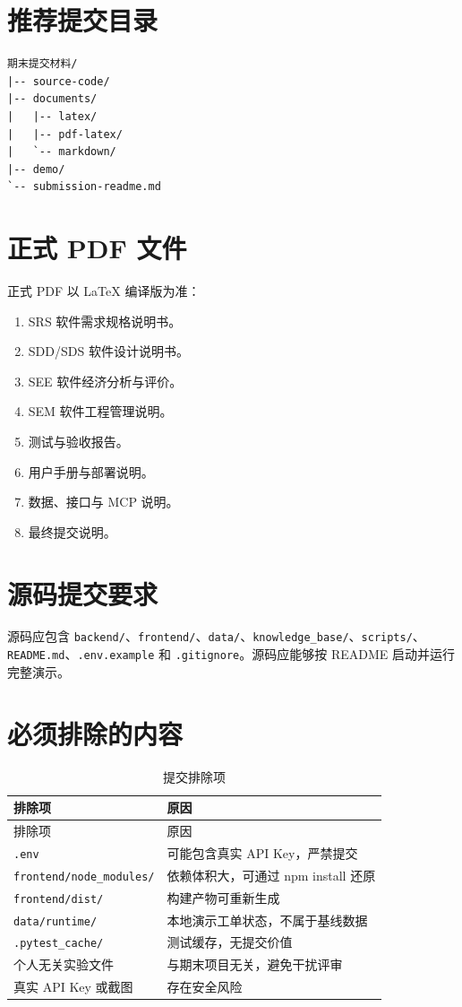 \documentclass[12pt,a4paper]{ctexart}
\newcommand{\code}[1]{{\footnotesize\nolinkurl{#1}}}
\begin{document}
\section{推荐提交目录}
\begin{verbatim}
期末提交材料/
|-- source-code/
|-- documents/
|   |-- latex/
|   |-- pdf-latex/
|   `-- markdown/
|-- demo/
`-- submission-readme.md
\end{verbatim}

\section{正式 PDF 文件}
正式 PDF 以 LaTeX 编译版为准：
\begin{enumerate}
    \item SRS 软件需求规格说明书。
    \item SDD/SDS 软件设计说明书。
    \item SEE 软件经济分析与评价。
    \item SEM 软件工程管理说明。
    \item 测试与验收报告。
    \item 用户手册与部署说明。
    \item 数据、接口与 MCP 说明。
    \item 最终提交说明。
\end{enumerate}

\section{源码提交要求}
源码应包含 \code{backend/}、\code{frontend/}、\code{data/}、\code{knowledge_base/}、\code{scripts/}、\code{README.md}、\code{.env.example} 和 \code{.gitignore}。源码应能够按 README 启动并运行完整演示。

\section{必须排除的内容}
\begin{longtable}{p{4cm}p{9.8cm}}
\caption{提交排除项}\\
\toprule
排除项 & 原因 \\
\midrule
\endfirsthead
\toprule
排除项 & 原因 \\
\midrule
\endhead
\code{.env} & 可能包含真实 API Key，严禁提交 \\
\code{frontend/node_modules/} & 依赖体积大，可通过 npm install 还原 \\
\code{frontend/dist/} & 构建产物可重新生成 \\
\code{data/runtime/} & 本地演示工单状态，不属于基线数据 \\
\code{.pytest_cache/} & 测试缓存，无提交价值 \\
个人无关实验文件 & 与期末项目无关，避免干扰评审 \\
真实 API Key 或截图 & 存在安全风险 \\
\bottomrule
\end{longtable}
\end{document}
